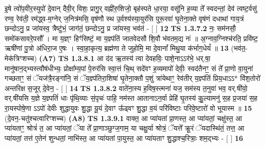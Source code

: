 \documentclass[17pt]{extarticle}
\begin{document}
                  इ॒षे त्वो॑प॒वीर॒स्युपो॑ दे॒वान् दैवी॒र् विशः॒ प्रागु॒र् वह्नी॑रु॒शिजो॒ बृह॑स्पते धा॒रया॒ वसू॑नि ह॒व्या ते᳚ स्वदन्तां॒ देव॑ त्वष्ट॒र्वसु॑ रण्व॒ रेव॑ती॒ रम॑द्ध्व-म॒ग्नेर् ज॒नित्र॑मसि॒ वृष॑णौ स्थ उ॒र्वश्य॑स्या॒युर॑सि पुरू॒रवा॑ घृ॒तेना॒क्ते वृष॑णं दधाथां गाय॒त्रं छन्दोऽनु॒ प्र जा॑यस्व॒ त्रैष्टु॑भं॒ जाग॑तं॒ छन्दोऽनु॒ प्र जा॑यस्व॒ भव॑तं - [ ] \textbf{  12} \newline
                  \newline
                                \textbf{ TS 1.3.7.2} \newline
                  नः॒ सम॑नसौ॒ समो॑कसावरे॒पसौ᳚ । मा य॒ज्ञ्ꣳ हिꣳ॑सिष्टं॒ मा य॒ज्ञ्प॑तिं जातवेदसौ शि॒वौ भ॑वतम॒द्य नः॑ ॥ अ॒ग्नाव॒ग्निश्च॑रति॒ प्रवि॑ष्ट॒ ऋषी॑णां पु॒त्रो अ॑धिरा॒ज ए॒षः । स्वा॒हा॒कृत्य॒ ब्रह्म॑णा ते जुहोमि॒ मा दे॒वानां᳚ मिथु॒या क॑र्भाग॒धेयं᳚ ॥ \textbf{  13 } \newline
                  \newline
                      (भव॑त॒-मेक॑त्रिꣳशच्च)  \textbf{(A7)} \newline \newline
                                        \textbf{ TS 1.3.8.1} \newline
                  आ द॑द ऋ॒तस्य॑ त्वा देवहविः॒ पाशे॒नाऽऽर॑भे॒ धर्.षा॒ मानु॑षान॒द्भ्यस्त्वौष॑धीभ्यः॒ प्रोक्षा᳚म्य॒पां पे॒रुर॑सि स्वा॒त्तं चि॒थ् सदे॑वꣳ ह॒व्यमापो॑ देवीः॒ स्वद॑तैनꣳ॒॒ सं ते᳚ प्रा॒णो वा॒युना॑ गच्छताꣳ॒॒ सं ॅयज॑त्रै॒रङ्गा॑नि॒ सं ॅय॒ज्ञ्प॑तिरा॒शिषा॑ घृ॒तेना॒क्तौ प॒शुं त्रा॑येथाꣳ॒॒ रेव॑तीर् य॒ज्ञ्प॑तिं प्रिय॒धाऽऽ* वि॑श॒तोरो॑ अन्तरिक्ष स॒जूर् दे॒वेन॒ - [ ] \textbf{  14} \newline
                  \newline
                                \textbf{ TS 1.3.8.2} \newline
                  वाते॑ना॒स्य ह॒विष॒स्त्मना॑ यज॒ सम॑स्य त॒नुवा॑ भव॒ वर्.षी॑यो॒ वर्.षी॑यसि य॒ज्ञे य॒ज्ञ्पतिं॑ धाः पृ॑थि॒व्याः सं॒पृचः॑ पाहि॒ नम॑स्त आतानाऽन॒र्वा प्रेहि॑ घृ॒तस्य॑ कु॒॒ल्यामनु॑ स॒ह प्र॒जया॑ स॒ह रा॒यस्पोषे॒णा ऽऽपो॑ देवीः शुद्धायुवः शु॒द्धा यू॒यं दे॒वाꣳ ऊ᳚ढ्वꣳ शु॒द्धा व॒यं परि॑विष्टाः परिवे॒ष्टारो॑ वो भूयास्म ॥ \textbf{  15} \newline
                  \newline
                      (दे॒वन॒-चतु॑श्चत्वारिꣳशच्च)  \textbf{(A8)} \newline \newline
                                        \textbf{ TS 1.3.9.1} \newline
                  वाक्त॒ आ प्या॑यतां प्रा॒णस्त॒ आ प्या॑यतां॒ चक्षु॑स्त॒ आ प्या॑यताꣳ॒॒ श्रोत्रं॑ त॒ आ प्या॑यतां॒ ॅया ते᳚ प्रा॒णाञ्छुग्ज॒गाम॒ या चक्षु॒र्या श्रोत्रं॒ ॅयत्ते᳚ क्रू॒रं ॅयदास्थि॑तं॒ तत्त॒ आ प्या॑यतां॒ तत्त॑ ए॒तेन॑ शुन्धतां॒ नाभि॑स्त॒ आ प्या॑यतां पा॒युस्त॒ आ प्या॑यताꣳ शु॒द्धाश्च॒रित्राः॒ शम॒द्भ्यः - [ ] \textbf{  16} \newline
\end{document}
